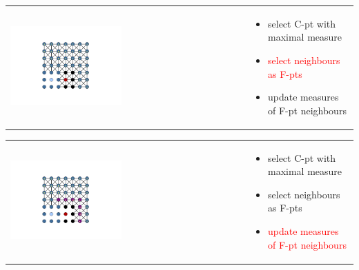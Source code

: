 \documentclass{beamer}
\newcommand{\re}[1]{{\textcolor{red}       {#1}}}
\begin{document}
\begin{frame}



\begin{tabular}{ p{} p{}}

\hspace{5mm} \includegraphics[trim = 85mm 40mm 85mm  40mm, clip, width=0.48\textwidth]{../figures/AMG6.png} &

\vspace{-1.75in}

\begin{itemize}
  \item select C-pt with maximal measure
  \item \re{select neighbours as F-pts}
  \item update measures of F-pt neighbours

\end{itemize}

\end{tabular}

\end{frame}


\begin{frame}


\begin{tabular}{ p{} p{}}

\hspace{5mm} \includegraphics[trim = 85mm 40mm 85mm  40mm, clip, width=0.48\textwidth]{../figures/AMG7.png} &

\vspace{-1.75in}

\begin{itemize}
  \item select C-pt with maximal measure
  \item select neighbours as F-pts
  \item \re{update measures of F-pt neighbours}

\end{itemize}

\end{tabular}

\end{frame}
\end{document}
